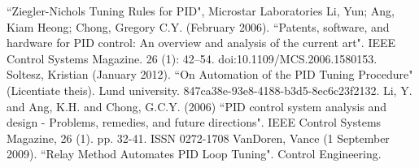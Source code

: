 \begin{thebibliography}{99}
 ``Ziegler-Nichols Tuning Rules for PID", Microstar Laboratories
 Li, Yun; Ang, Kiam Heong; Chong, Gregory C.Y. (February 2006). ``Patents, software, and hardware for PID control: An overview and analysis of the current art". IEEE Control Systems Magazine. 26 (1): 42–54. doi:10.1109/MCS.2006.1580153.
 Soltesz, Kristian (January 2012). ``On Automation of the PID Tuning Procedure" (Licentiate theis). Lund university. 847ca38e-93e8-4188-b3d5-8ec6c23f2132.
 Li, Y. and Ang, K.H. and Chong, G.C.Y. (2006) ``PID control system analysis and design - Problems, remedies, and future directions". IEEE Control Systems Magazine, 26 (1). pp. 32-41. ISSN 0272-1708
 VanDoren, Vance (1 September 2009). ``Relay Method Automates PID Loop Tuning". Control Engineering.











\end{thebibliography}
